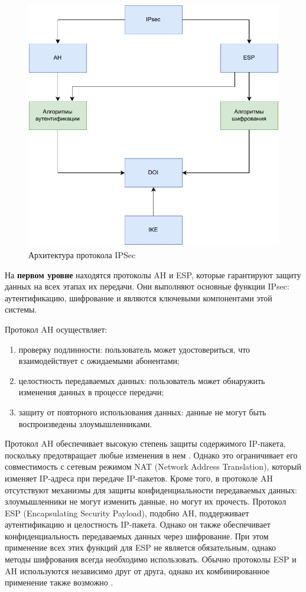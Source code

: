 \begin{figure}[h!]
	\centering
	\includegraphics[width=\textwidth]{img/ipsec.pdf}
	\caption{Архитектура протокола IPSec}
	\label{fig:ipsec}
\end{figure}

На \textbf{первом уровне} находятся протоколы AH и ESP, которые гарантируют защиту данных на всех этапах их передачи. Они выполняют основные функции IPsec: аутентификацию, шифрование и являются ключевыми компонентами этой системы.

Протокол AH осуществляет:

\begin{enumerate}
	\item проверку подлинности: пользователь может удостовериться, что взаимодействует с ожидаемыми абонентами;
	\item целостность передаваемых данных: пользователь может обнаружить изменения данных в процессе передачи;
	\item защиту от повторного использования данных: данные не могут быть воспроизведены злоумышленниками.
\end{enumerate}

Протокол AH обеспечивает высокую степень защиты содержимого IP-пакета, поскольку предотвращает любые изменения в нем \cite{ah}. Однако это ограничивает его совместимость с сетевым режимом NAT (Network Address Translation), который изменяет IP-адреса при передаче IP-пакетов. Кроме того, в протоколе AH отсутствуют механизмы для защиты конфиденциальности передаваемых данных: злоумышленники не могут изменить данные, но могут их прочесть. Протокол ESP (Encapsulating Security Payload), подобно AH, поддерживает аутентификацию и целостность IP-пакета. Однако он также обеспечивает конфиденциальность передаваемых данных через шифрование. При этом применение всех этих функций для ESP не является обязательным, однако методы шифрования всегда необходимо использовать. Обычно протоколы ESP и AH используются независимо друг от друга, однако их комбинированное применение также возможно \cite{esp}.

